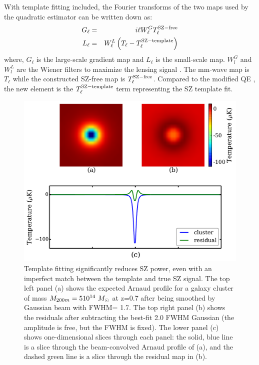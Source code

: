 With template fitting included, the Fourier transforms of the two maps used by the quadratic estimator can be written down as:
\begin{eqnarray}
G_{\ell} &=& i\ell W^{G}_{\ell} T^{\rm SZ-free}_{\ell}\\
L_{\ell} &=& W^{L}_{\ell} \left(T_{\ell} - T_\ell^{\rm SZ-template}\right)
\end{eqnarray}
where, $G_{\ell}$ is the large-scale gradient map and $L_{\ell}$ is the small-scale map. 
$W^{G}_{l}$ and $W^{L}_{l} $ are the Wiener filters to maximize the lensing signal \cite{hu07}. 
The mm-wave map is $T_{\ell}$ while the constructed SZ-free map is $T^{\rm SZ-free}_{\ell}$. 
Compared to the modified QE \citep{madhavacheril18,raghunathan18}, the new element is the $T_\ell^{\rm SZ-template}$ term representing the SZ template fit. 




\begin{figure}
\includegraphics[width=\linewidth, keepaspectratio]{figs/template_fitting.pdf}
 \caption{Template fitting significantly reduces SZ power, even with an imperfect match between the template and true SZ signal. 
The top left panel (a) shows the expected Arnaud profile for a galaxy cluster of mass $M_{200m} = 5 10^{14}~ {M}_{\odot}$ at z=0.7 after being smoothed by Gaussian beam with FWHM= 1\arcmin.7.
The top right panel (b) shows the residuals after subtracting the best-fit 2\arcmin.0 FWHM Gaussian (the amplitude is free, but the FWHM is fixed). 
The lower panel (c) shows one-dimensional slices through each panel: the solid, blue line is a slice through the beam-convolved Arnaud profile of (a), and the dashed green line is a slice through the residual map in (b). 
 } 
\label{fig:residual}
\end{figure}

